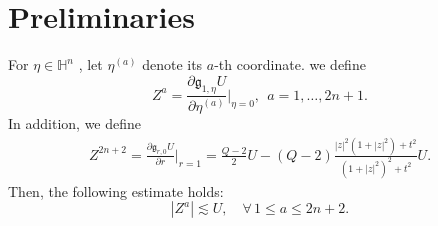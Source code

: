 \documentclass[11pt]{article}
\begin{document}
\section{Preliminaries}\label{sec2}
For $\eta \in \mathbb{H}^n$ , let  $\eta^{(a)}$ denote its $a$-th coordinate.
we define
  \begin{equation}\label{Z1}
  Z^{a}=\frac{\partial \mathfrak{g}_{1, \eta}U }{\partial\eta^{(a)}}\bigg|_{ \eta=0},~~ a=1,\ldots, 2n+1.
  \end{equation}
  In addition, we define
\begin{equation}\label{Z2}
\begin{aligned}
Z^{2n+2}= \frac{\partial \mathfrak{g}_{r, 0}U }{\partial r}\bigg|_{r=1}=%
\frac{Q-2}{2}U-(Q-2)\frac{|z|^2(1+|z|^2)+t^2}{(1+|z|^2)^2+t^2} U.
\end{aligned}
\end{equation}
  Then, the following estimate holds:
\begin{equation*}
|Z^{a}|\lesssim U,\quad \forall \, 1\leq a\leq  2n+2.
\end{equation*}
\end{document}
